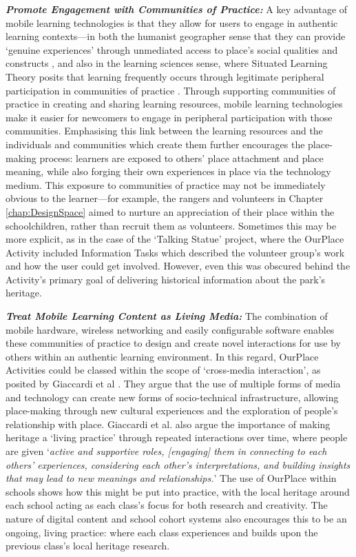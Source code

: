 \textbf{\textit{Promote Engagement with Communities of Practice:}} A key advantage of mobile learning technologies is that they allow for users to engage in authentic learning contexts---in both the humanist geographer sense that they can provide `genuine experiences' through unmediated access to place's social qualities and constructs \citep{Relph1976}, and also in the learning sciences sense, where Situated Learning Theory posits that learning frequently occurs through legitimate peripheral participation in communities of practice \citep{lave1991situated}. Through supporting communities of practice in creating and sharing learning resources, mobile learning technologies make it easier for newcomers to engage in peripheral participation with those communities. Emphasising this link between the learning resources and the individuals and communities which create them further encourages the place-making process: learners are exposed to others' place attachment and place meaning, while also forging their own experiences in place via the technology medium. This exposure to communities of practice may not be immediately obvious to the learner---for example, the rangers and volunteers in Chapter \ref{chap:DesignSpace} aimed to nurture an appreciation of their place within the schoolchildren, rather than recruit them as volunteers. Sometimes this may be more explicit, as in the case of the `Talking Statue' project, where the OurPlace Activity included Information Tasks which described the volunteer group's work and how the user could get involved. However, even this was obscured behind the Activity's primary goal of delivering historical information about the park's heritage.

\textbf{\textit{Treat Mobile Learning Content as Living Media:}} The combination of mobile hardware, wireless networking and easily configurable software enables these communities of practice to design and create novel interactions for use by others within an authentic learning environment. In this regard, OurPlace Activities could be classed within the scope of `cross-media interaction', as posited by Giaccardi et al \citep{Giaccardi2008}. They argue that the use of multiple forms of media and technology can create new forms of socio-technical infrastructure, allowing place-making through new cultural experiences and the exploration of people's relationship with place. Giaccardi et al. also argue the importance of making heritage a `living practice' through repeated interactions over time, where people are given `\textit{active and supportive roles, [engaging] them in connecting to each others’ experiences, considering each other’s interpretations, and building insights that may lead to new meanings and relationships.}' The use of OurPlace within schools shows how this might be put into practice, with the local heritage around each school acting as each class's focus for both research and creativity. The nature of digital content and school cohort systems also encourages this to be an ongoing, living practice: where each class experiences and builds upon the previous class's local heritage research. 

